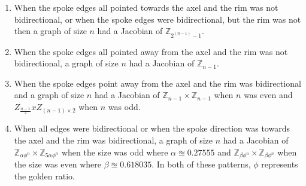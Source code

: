 \documentclass[11pt,reqno]{amsart}
\theoremstyle{definition}
\theoremstyle{plain}
\begin{document}
		\begin{enumerate}
			\item When the spoke edges all pointed towards the axel and the rim was not bidirectional, or when
			the spoke edges were bidirectional, but the rim was not then a graph of size $n$ had a
			Jacobian of $\mathbb{Z}_{2^(n-1)-1}$.
			\item When the spoke edges all pointed away from the axel and the rim was not bidirectional,
			a graph of size $n$ had a Jacobian of $\mathbb{Z}_{n-1}$.
			\item When the spoke edges point away from the axel and the rim was bidirectional and a graph of size
			$n$ had a Jacobian of $\mathbb{Z}_{n-1} \times \mathbb{Z}_{n-1}$ when $n$ was even
			and $Z_{\frac{n-1}{2}} x Z_{(n-1) \times 2}$ when $n$ was odd.
			\item When all edges were bidirectional or when the spoke direction was towards the axel and
			the rim was bidirectional, a graph of size $n$ had a Jacobian of
			$\mathbb{Z}_{\alpha\phi^{n}} \times \mathbb{Z}_{5\alpha\phi^{n}}$ when the size
			was odd where $\alpha \approxeq 0.27555$ and $\mathbb{Z}_{\beta\phi^{n}} \times \mathbb{Z}_{\beta\phi^{n}}$
			when the size was even where $\beta \approxeq 0.618035$. In both of these patterns,
			$\phi$ represents the golden ratio.
		\end{enumerate}


\end{document}
